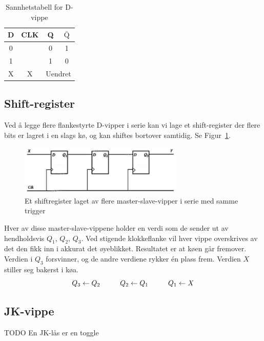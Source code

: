 \documentclass[12pt,a4paper,norsk]{article}
\newcommand{\rising}{\texttiming{[-,timing/slope=0]LH}}
\begin{document}
\begin{table}[hbt!]
  \centering
  \begin{tabular}{cc|cc}
    \toprule
    D & CLK & Q & $\bar{\text{Q}}$ \\
    \midrule
    0 & \rising{} & 0 & 1\\
    1 & \rising{} & 1 & 0\\
    X & X & \multicolumn{2}{c}{Uendret}\\
    \bottomrule
  \end{tabular}
  \caption{Sannhetstabell for D-vippe}
\end{table}

\subsection{Shift-register}
Ved å legge flere flankestyrte D-vipper i serie kan vi lage et shift-register der
flere bits er lagret i en slags kø, og kan shiftes bortover samtidig. Se Figur~\ref{fig:trigger_shift}.

\begin{figure}[hbt!]
  \centering
  \includegraphics[width=0.7\textwidth,height=\textheight,keepaspectratio]{Krets_TriggerShift}
  \caption{Et shiftregister laget av flere master-slave-vipper i serie med samme trigger\label{fig:trigger_shift}}
\end{figure}

Hver av disse master-slave-vippene holder en verdi som de sender ut av hendholdsvis $Q_{1}$,
$Q_{2}$, $Q_{3}$. Ved stigende klokkeflanke vil hver vippe overskrives av det
den fikk inn i akkurat det øyeblikket. Resultatet er at køen går fremover.
Verdien i $Q_{3}$ forsvinner, og de andre verdiene rykker én plass frem. Verdien
$X$ stiller seg bakerst i køa.
\[
  Q_{3} \leftarrow Q_{2} \hspace{10mm} Q_{2} \leftarrow Q_{1} \hspace{10mm}  Q_{1} \leftarrow X
\]

\subsection{JK-vippe}
TODO
En JK-lås er en toggle
\end{document}
